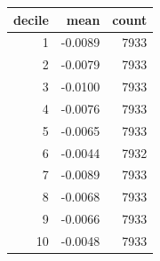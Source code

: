 \begin{tabular}{rrr}
\toprule
decile & mean & count \\
\midrule
1 & -0.0089 & 7933 \\
2 & -0.0079 & 7933 \\
3 & -0.0100 & 7933 \\
4 & -0.0076 & 7933 \\
5 & -0.0065 & 7933 \\
6 & -0.0044 & 7932 \\
7 & -0.0089 & 7933 \\
8 & -0.0068 & 7933 \\
9 & -0.0066 & 7933 \\
10 & -0.0048 & 7933 \\
\bottomrule
\end{tabular}
